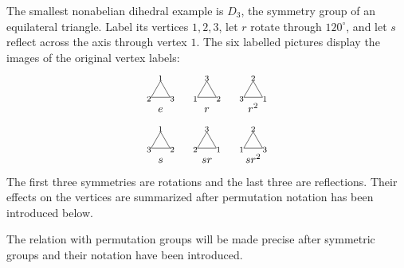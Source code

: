 The smallest nonabelian dihedral example is \(D_3\), the symmetry group of an
equilateral triangle. Label its vertices \(1,2,3\), let \(r\) rotate through
\(120^\circ\), and let \(s\) reflect across the axis through vertex \(1\).
The six labelled pictures display the images of the original vertex labels:
\[
\begin{array}{ccc}
\begin{tikzpicture}[baseline=-.5ex,scale=.34]\draw (0,1)--(-.87,-.5)--(.87,-.5)--cycle;\node at (0,1.25){\scriptsize1};\node at (-1.08,-.65){\scriptsize2};\node at (1.08,-.65){\scriptsize3};\end{tikzpicture}&
\begin{tikzpicture}[baseline=-.5ex,scale=.34]\draw (0,1)--(-.87,-.5)--(.87,-.5)--cycle;\node at (0,1.25){\scriptsize3};\node at (-1.08,-.65){\scriptsize1};\node at (1.08,-.65){\scriptsize2};\end{tikzpicture}&
\begin{tikzpicture}[baseline=-.5ex,scale=.34]\draw (0,1)--(-.87,-.5)--(.87,-.5)--cycle;\node at (0,1.25){\scriptsize2};\node at (-1.08,-.65){\scriptsize3};\node at (1.08,-.65){\scriptsize1};\end{tikzpicture}\\[-2pt]
e&r&r^2\\[6pt]
\begin{tikzpicture}[baseline=-.5ex,scale=.34]\draw (0,1)--(-.87,-.5)--(.87,-.5)--cycle;\node at (0,1.25){\scriptsize1};\node at (-1.08,-.65){\scriptsize3};\node at (1.08,-.65){\scriptsize2};\end{tikzpicture}&
\begin{tikzpicture}[baseline=-.5ex,scale=.34]\draw (0,1)--(-.87,-.5)--(.87,-.5)--cycle;\node at (0,1.25){\scriptsize3};\node at (-1.08,-.65){\scriptsize2};\node at (1.08,-.65){\scriptsize1};\end{tikzpicture}&
\begin{tikzpicture}[baseline=-.5ex,scale=.34]\draw (0,1)--(-.87,-.5)--(.87,-.5)--cycle;\node at (0,1.25){\scriptsize2};\node at (-1.08,-.65){\scriptsize1};\node at (1.08,-.65){\scriptsize3};\end{tikzpicture}\\[-2pt]
s&sr&sr^2
\end{array}
\]
The first three symmetries are rotations and the last three are reflections.
Their effects on the vertices are summarized after permutation notation has
been introduced below.

The relation with permutation groups will be made precise after symmetric
groups and their notation have been introduced.

